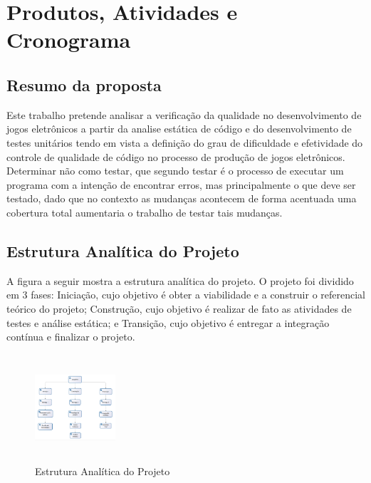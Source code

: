 \chapter[Produtos, Atividades e Cronograma]{Produtos, Atividades e Cronograma}

\section{Resumo da proposta}
	Este trabalho pretende analisar a verificação da qualidade no desenvolvimento de jogos eletrônicos a partir da analise estática de código e do desenvolvimento de testes unitários tendo em vista a definição do grau de dificuldade e efetividade do controle de qualidade de código no processo de produção de jogos eletrônicos.
	Determinar não como testar, que segundo  testar é o processo de executar um programa com a intenção de encontrar erros, mas principalmente o que deve ser testado, dado que no contexto as mudanças acontecem de forma acentuada uma cobertura total aumentaria o trabalho de testar tais mudanças.
\section{Estrutura Analítica do Projeto}

A figura a seguir mostra a estrutura analítica do projeto. O projeto foi dividido em 3 fases: Iniciação, cujo objetivo é obter a viabilidade e a construir o referencial teórico do projeto; Construção, cujo objetivo é realizar de fato as atividades de testes e análise estática; e Transição, cujo objetivo é entregar a integração contínua e finalizar o projeto.

\begin{figure}[h]
 \centering
 \includegraphics[width=3cm, height=4cm]{figuras/eap.png}
 \caption{Estrutura Analítica do Projeto}
\end{figure}

